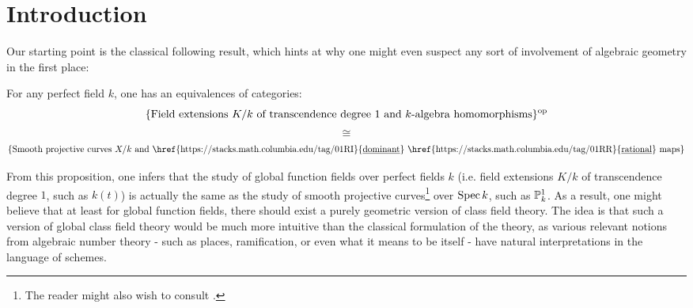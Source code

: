     \section{Introduction}
        Our starting point is the classical following result, which hints at why one might even suspect any sort of involvement of algebraic geometry in the first place:
        \begin{proposition} \label{prop: curves_and_function_fields}
            \cite[\href{https://stacks.math.columbia.edu/tag/0BY1}{Tag 0BY1}]{stacks} For any perfect field $k$, one has an equivalences of categories:
                $$\{\text{Field extensions $K/k$ of transcendence degree $1$ and $k$-algebra homomorphisms}\}^{\op}$$
                $$\cong$$
                $$\{\text{Smooth projective curves $X/k$ and \href{https://stacks.math.columbia.edu/tag/01RI}{\underline{dominant}} \href{https://stacks.math.columbia.edu/tag/01RR}{\underline{rational}} maps}\}$$
        \end{proposition}
        From this proposition, one infers that the study of global function fields over perfect fields $k$ (i.e. field extensions $K/k$ of transcendence degree $1$, such as $k(t)$) is actually the same as the study of smooth projective curves\footnote{The reader might also wish to consult \cite[Sections I.13 and I.14]{neukirch_2010_algebraic_number_theory}.} over $\Spec k$, such as $\P^1_k$. As a result, one might believe that at least for global function fields, there should exist a purely geometric version of class field theory. The idea is that such a version of global class field theory would be much more intuitive than the classical formulation of the theory, as various relevant notions from algebraic number theory - such as places, ramification, or even what it means to be  itself - have natural interpretations in the language of schemes. 
        
